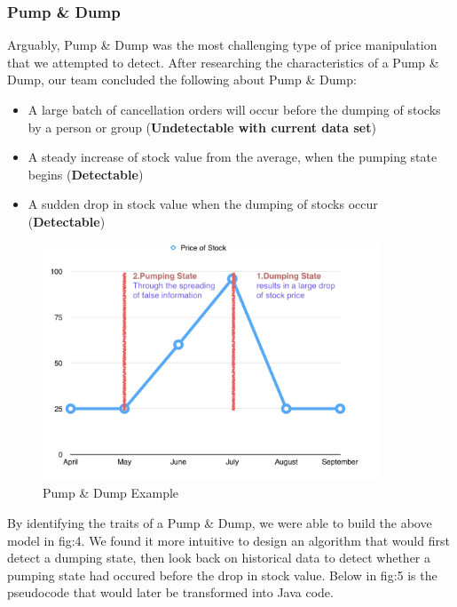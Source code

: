 \documentclass[12pt]{article}
\begin{document}
    \subsubsection{Pump \& Dump}
    Arguably, Pump \& Dump was the most challenging type of price manipulation that we attempted to detect.
    After researching the characteristics of a Pump \& Dump, our team concluded the following about Pump \& Dump:
    \begin{itemize}
      \itemsep0em
      \item A large batch of cancellation orders will occur before the dumping of stocks by a person or group (\textbf{Undetectable with current data set})
      \item A steady increase of stock value from the average, when the pumping state begins (\textbf{Detectable})
      \item A sudden drop in stock value when the dumping of stocks occur (\textbf{Detectable})
    \end{itemize}
    \begin{figure}[H]
    \centering
    \includegraphics[width=100mm]{PumpDumpGraph.png}
    \caption{Pump \& Dump Example}
    \end{figure}
    By identifying the traits of a Pump \& Dump, we were able to build the above model in fig:4.
    We found it more intuitive to design an algorithm that would first detect a dumping state, then look back
    on historical data to detect whether a pumping state had occured before the drop in stock value. Below in fig:5 is the
    pseudocode that would later be transformed into Java code.
\end{document}

